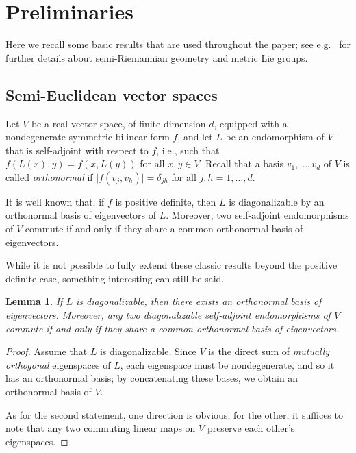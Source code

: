 \documentclass[a4paper,12pt,oneside]{amsart}
\theoremstyle{plain}
\newtheorem{lemma}[theorem]{Lemma}
\theoremstyle{remark}
\theoremstyle{definition}
\begin{document}
\section{Preliminaries} \label{PRE}
Here we recall some basic results that are used throughout the paper; see e.g.\ \cite{milnor1976, lee2018, oneill1983} for further details about semi-Riemannian geometry and metric Lie groups.

\subsection{Semi-Euclidean vector spaces}
Let $V$ be a real vector space, of finite dimension $d$, equipped with a nondegenerate symmetric bilinear form $f$, and let $L$ be an endomorphism of $V$ that is self-adjoint with respect to $f$, i.e., such that $f(L(x), y) = f(x,L(y))$ for all $x,y\in V$. Recall that a basis $v_{1}, \dotsc, v_{d}$ of $V$ is called \textit{orthonormal} if $\vert f(v_{j},v_{h}) \rvert= \delta_{jh}$ for all $j,h =1, \dotsc, d$.

It is well known that, if $f$ is positive definite, then $L$ is diagonalizable by an orthonormal basis of eigenvectors of $L$. Moreover, two self-adjoint endomorphisms of $V$ commute if and only if they share a common orthonormal basis of eigenvectors.

While it is not possible to fully extend these classic results beyond the positive definite case, something interesting can still be said.

\begin{lemma} \label{OrthogonalEigendecompositionLemma}
	If $L$ is diagonalizable, then there exists an orthonormal basis of eigenvectors. Moreover, any two  diagonalizable self-adjoint endomorphisms of $V$ commute if and only if they share a common orthonormal basis of eigenvectors. 
\end{lemma}
\begin{proof}
Assume that $L$ is diagonalizable. Since $V$ is the direct sum of \emph{mutually orthogonal} eigenspaces of $L$, each eigenspace must be nondegenerate, and so it has an orthonormal basis; by concatenating these bases, we obtain an orthonormal basis of $V$.

As for the second statement, one direction is obvious; for the other, it suffices to note that any two commuting linear maps on $V$ preserve each other's eigenspaces.
\end{proof}

\end{document}
